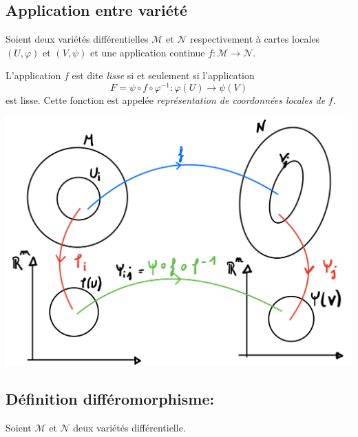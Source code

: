 \subsection{Application entre variété}
Soient deux variétés différentielles $\mathcal{M}$ et $ \mathcal{N}$ respectivement à cartes locales $(U,\varphi)$ et $(V,\psi)$ et une application continue $f:\mathcal{M} \to \mathcal{N}$.

\begin{theoremframe}
    \begin{defi}
        L'application $f$ est dite \emph{lisse} si et seulement si l'application 
        \begin{equation}
        F = \psi \circ f \circ \varphi^{-1}:\varphi(U) \to \psi(V)
        \end{equation}
        est lisse. Cette fonction est appelée \emph{représentation de coordonnées locales de} $f$.
    \end{defi}
\end{theoremframe}

\begin{center}
\includegraphics[scale=0.1]{Chapitres/3.Element de géométrie différentielle/Images/fonction de transistion.jpg}
\end{center}

\subsection{Définition différomorphisme:}

Soient $\mathcal{M}$ et $\mathcal{N}$ deux variétés différentielle. 

